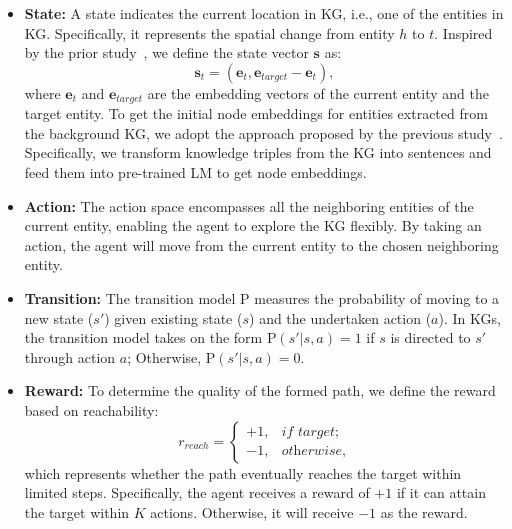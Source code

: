 \documentclass{article}
\theoremstyle{boldremark}
\begin{document}
\begin{itemize}[leftmargin=*]
    \item \textbf{State:} A state indicates the current location in KG, i.e., one of the entities in KG. Specifically, it represents the spatial change from entity $h$ to $t$. Inspired by the prior study~\cite{xiong2017deeppath}, we define the state vector $\boldsymbol{s}$ as:\vspace{-2mm}
    \begin{equation}
        \boldsymbol{s}_{t} = (\boldsymbol{e}_{t}, \boldsymbol{e}_{target} - \boldsymbol{e}_{t}), 
    \end{equation}
    where $\boldsymbol{e}_{t}$ and $\boldsymbol{e}_{target}$ are the embedding vectors of the current entity and the target entity. To get the initial node embeddings for entities extracted from the background KG, we adopt the approach proposed by the previous study~\cite{MHGRN}. Specifically, we transform knowledge triples from the KG into sentences and feed them into pre-trained LM to get node embeddings.
    \item \textbf{Action:} The action space encompasses all the neighboring entities of the current entity, enabling the agent to explore the KG flexibly. By taking an action, the agent will move from the current entity to the chosen neighboring entity.
    \item \textbf{Transition:} The transition model $\mathrm{P}$ measures the probability of moving to a new state ($s'$) given existing state ($s$) and the undertaken action ($a$). In KGs, the transition model takes on the form $\mathrm{P}(s'|s,a) = 1$ if $s$ is directed to $s'$ through action $a$; Otherwise, $\mathrm{P}(s'|s,a) = 0$.
    
    \item \textbf{Reward:} To determine the quality of the formed path, we define the reward based on reachability: 
\begin{equation}
r_{reach} =
\begin{cases}
    +1 , & \textit{if } target; \\
    -1 , & \textit{otherwise},
\end{cases}
\end{equation} 
which represents whether the path eventually reaches the target within limited steps. Specifically, the agent receives a  reward of $+1$ if it can attain the target within $K$ actions. Otherwise, it will receive $-1$ as the reward.
    
\end{itemize}
\end{document}
